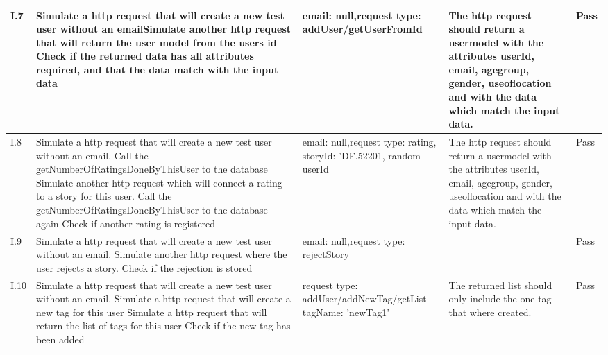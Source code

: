 \begin{appendices}
\begin{center}
\begin{longtable}{ | p{1cm} | p{5.5cm} | p{4cm} | p{4.5cm} | p{2cm}|}
		I.7 & Simulate a http request that will create a new test user without an email\newline  Simulate another http request that will return the user model from the users id \newline Check if the returned data has all attributes required, and that the data match with the input data & email: null,\newline request type: addUser/getUserFromId  & The http request should return a usermodel with the attributes userId, email, age\textunderscore group, gender, use\textunderscore of\textunderscore location and with the data which match the input data. & Pass\\ \hline
		
		I.8 & Simulate a http request that will create a new test user without an email. \newline Call the getNumberOfRatingsDoneByThisUser to the database \newline  Simulate another http request which will connect a rating to a story for this user.  \newline Call the getNumberOfRatingsDoneByThisUser to the database again \newline Check if another rating is registered & email: null,\newline request type: rating, storyId: 'DF.52201, random userId  & The http request should return a usermodel with the attributes userId, email, age\textunderscore group, gender, use\textunderscore of\textunderscore location and with the data which match the input data. & Pass \\ \hline
		
		I.9 & Simulate a http request that will create a new test user without an email. \newline  \newline  Simulate another http request where the user rejects a story.  \newline  \newline Check if the rejection is stored & email: null,\newline request type: rejectStory  &  & Pass \\ \hline
		
		I.10 & Simulate a http request that will create a new test user without an email. \newline  Simulate a http request that will create a new tag for this user \newline Simulate a http request that will return the list of tags for this user \newline Check if the new tag has been added  & request type: addUser/addNewTag/getList  tagName: 'newTag1' & The returned list should only include the one tag that where created.& Pass\\ \hline
		

\end{longtable}
\end{center}
\end{appendices}
